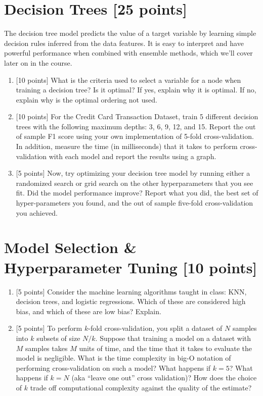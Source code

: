 \documentclass[letterpaper]{article}
\begin{document}
\section{Decision Trees [25 points]}

The decision tree model predicts the value of a target variable by learning simple decision rules inferred from the data features. It is easy to interpret and have powerful performance when combined with ensemble methods, which we'll cover later on in the course.

\begin{enumerate}
  \item {[10 points]} What is the criteria used to select a variable for a node when training a decision tree? Is it optimal? If yes, explain why it is optimal. If no, explain why is the optimal ordering not used.
  

  \item {[10 points]} For the Credit Card Transaction Dataset, train 5 different decision trees with the following maximum depths: 3, 6, 9, 12, and 15. Report the out of sample F1 score using your own implementation of 5-fold cross-validation. In addition, measure the time (in milliseconds) that it takes to perform cross-validation with each model and report the results using a graph. 
  
  \item {[5 points]} Now, try optimizing your decision tree model by running either a randomized search or grid search on the other hyperparameters that you see fit. Did the model performance improve? Report what you did, the best set of hyper-parameters you found, and the out of sample five-fold cross-validation you achieved. 

\end{enumerate}


\section{Model Selection \& Hyperparameter Tuning [10 points]}

 \begin{enumerate}

\item {[5 points]} Consider the machine learning algorithms taught in class: KNN, decision trees, and logistic regressions. Which of these are considered high bias, and which of these are low bias? Explain. 

 
\item {[5 points]} To perform $k$-fold cross-validation, you split a dataset of $N$ samples into $k$ subsets of size $N/k$. Suppose that training a model on a dataset with $M$ samples takes $M$ units of time, and the time that it takes to evaluate the model is negligible. What is the time complexity in big-O notation of performing cross-validation on such a model? What happens if $k = 5$? What happens if $k = N$ (aka ``leave one out'' cross validation)? How does the choice of $k$ trade off computational complexity against the quality of the estimate?

 
 
\end{enumerate}
\end{document}
